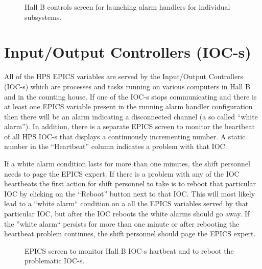 \documentclass[letter,10pt]{article}
\begin{document}
 \begin{figure}
  \centering
  \caption{Hall B controls screen for launching alarm handlers for individual subsystems.}
  \label{fig:alarm_handler_selection}
 \end{figure}

\section{Input/Output Controllers (IOC-s)}
All of the HPS EPICS variables are served by the Input/Output Controllers (IOC-s) which are processes and tasks running on 
various computers in Hall B and in the counting house. If one of the IOC-s stops communicating and there is at 
least one EPICS variable present in the running alarm handler configuration then there will be an alarm indicating 
a  disconnected channel (a so called ``white alarm''). In addition, there is a separate EPICS screen to monitor the 
heartbeat of all HPS IOC-s that displays a continuously incrementing number. A static number in the ``Heartbeat'' column 
indicates a problem with that IOC. 

If a white alarm condition lasts for more than one minutes, the shift personnel needs to page the EPICS expert. 
If there is a problem with any of the IOC heartbeats the first action for shift personnel to take is to reboot that particular IOC 
by clicking on the ``Reboot'' button next to that IOC. This will most likely lead to a ``white alarm`` condition on a 
all the EPICS variables served by that particular IOC, but after the IOC reboots the white alarms should go away. If the 
''white alarm`` persists for more than one minute or after rebooting the heartbeat problem continues, the shift personnel
should page the EPICS expert. 

 \begin{figure}
  \centering
  \caption{EPICS screen to monitor Hall B IOC-s hartbeat and to reboot the problematic IOC-s.}
  \label{fig:alarm_heartbeat}
 \end{figure}
\end{document}
